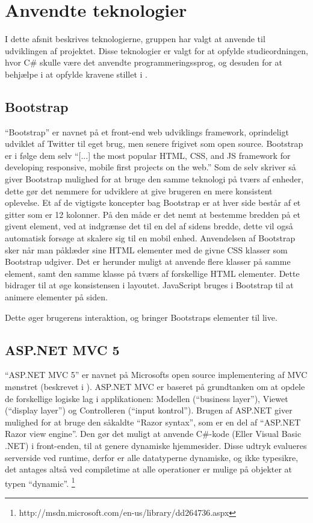 \section{Anvendte teknologier}
I dette afsnit beskrives teknologierne, gruppen har valgt at anvende til udviklingen af projektet.
Disse teknologier er valgt for at opfylde studieordningen, hvor C\# skulle være det anvendte programmeringssprog, og desuden for at behjælpe i at opfylde kravene stillet i .

\subsection{Bootstrap}
``Bootstrap'' er navnet på et front-end web udviklings framework, oprindeligt udviklet af Twitter til eget brug, men senere frigivet som open source. 
Bootstrap er i følge dem selv ``[...] the most popular HTML, CSS, and JS framework for developing responsive, mobile first projects on the web.'' \cite{GETBOOTSTRAP}
Som de selv skriver så giver Bootstrap mulighed for at bruge den samme teknologi på tværs af enheder, dette gør det nemmere for udviklere at give brugeren en mere konsistent oplevelse.
Et af de vigtigste koncepter bag Bootstrap er at hver side består af et gitter som er 12 kolonner. 
På den måde er det nemt at bestemme bredden på et givent element, ved at indgrænse det til en del af sidens bredde, dette vil også automatisk forsøge at skalere sig til en mobil enhed. 
Anvendelsen af Bootstrap sker når man påklæder sine HTML elementer med de givne CSS klasser som Bootstrap udgiver. 
Det er herunder muligt at anvende flere klasser på samme element, samt den samme klasse på tværs af forskellige HTML elementer. 
Dette bidrager til at øge konsistensen i layoutet.
JavaScript bruges i Bootstrap til at animere elementer på siden.
 
Dette øger brugerens interaktion, og bringer Bootstraps elementer til live. \cite{GETBOOTSTRAP}

\subsection{ASP.NET MVC 5}
``ASP.NET MVC 5'' er navnet på Microsofts open source implementering af MVC mønstret (beskrevet i ). 
ASP.NET MVC er baseret på grundtanken om at opdele de forskellige logiske lag i applikationen: Modellen (``business layer''), Viewet (``display layer'') og Controlleren (``input kontrol''). 
Brugen af ASP.NET giver mulighed for at bruge den såkaldte ``Razor syntax'', som er en del af ``ASP.NET Razor view engine''.
Den gør det muligt at anvende C\#-kode (Eller Visual Basic .NET) i front-enden, til at genere dynamiske hjemmesider. 
Disse udtryk evalueres serverside ved runtime, derfor er alle datatyperne dynamiske, og ikke typesikre, det antages altså ved compiletime at alle operationer er mulige på objekter at typen ``dynamic''. \footnote{http://msdn.microsoft.com/en-us/library/dd264736.aspx}

